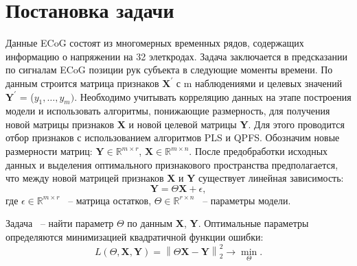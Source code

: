 \documentclass[12pt,twoside]{article}
\newcommand{\norm}[1]{\left\lVert#1\right\rVert}
\begin{document}
\section{Постановка задачи}

Данные ECoG состоят из многомерных временных рядов, содержащих информацию о напряжении на 32 элеткродах. Задача заключается в предсказании по сигналам ECoG позиции рук субъекта в следующие моменты времени. По данным строится матрица 
признаков $\textbf{X}^\prime$ с m наблюдениями и целевых значений $\textbf{Y}^\prime$ = ($y_1,\dots, y_m)$. 
Необходимо учитывать корреляцию данных на этапе построения модели и использовать алгоритмы,
понижающие размерность, для получения новой матрицы признаков \textbf{X} и новой целевой
матрицы \textbf{Y}.  Для этого проводится
отбор признаков с использованием алгоритмов PLS и QPFS. Обозначим новые размерности матриц: $\textbf{Y} \in \mathbb{R}^{m\times r}$, $\textbf{X} \in \mathbb{R}^{m\times n}$. После предобработки исходных данных и выделения оптимального признакового пространства предполагается, что между новой матрицей признаков \textbf{X} и \textbf{Y} существует линейная зависимость: $$ \textbf{Y} = \Theta \textbf{X} + \epsilon ,$$ где $\epsilon \in \mathbb{R}^{m\times r}$ ~-- матрица остатков, $\Theta \in \mathbb{R}^{r\times n}$ ~-- параметры модели. 

Задача ~-- найти параметр $\Theta$ по данным \textbf{X}, \textbf{Y}. Оптимальные параметры определяются минимизацией квадратичной функции ошибки:
$$ L(\Theta, \textbf{X}, \textbf{Y}) = \norm{\Theta \textbf{X} - \textbf{Y}}^2_2 \to \min_{\Theta}. $$


{}

\end{document}
